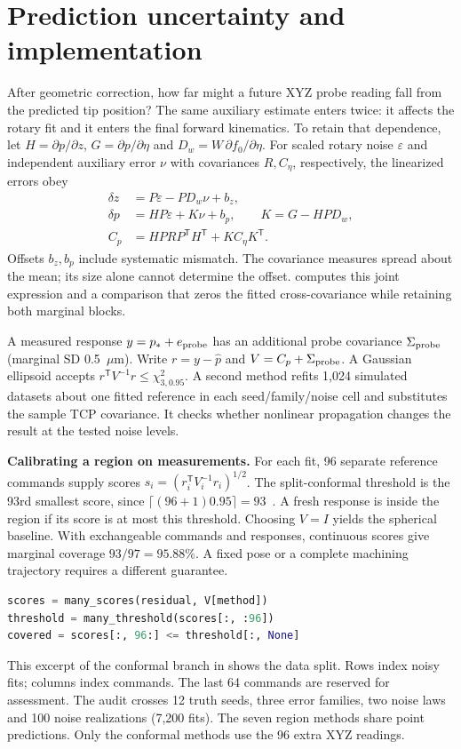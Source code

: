 \documentclass[11pt,a4paper]{article}
\newcommand{\um}{\ensuremath{\mu\mathrm{m}}}
\newcommand{\file}[1]{\texttt{\detokenize{#1}}}
\newcommand{\tr}{^{\mathsf T}}
\begin{document}
\section{Prediction uncertainty and implementation}
After geometric correction, how far might a future XYZ probe reading fall from the predicted tip position? The same auxiliary estimate enters twice: it affects the rotary fit and it enters the final forward kinematics. To retain that dependence, let $H=\partial p/\partial z$, $G=\partial p/\partial\eta$ and $D_w=W\,\partial f_0/\partial\eta$. For scaled rotary noise $\varepsilon$ and independent auxiliary error $\nu$ with covariances $R,C_\eta$, respectively, the linearized errors obey
\begin{align}
 \delta z&=P\varepsilon-PD_w\nu+b_z,\\
 \delta p&=HP\varepsilon+K\nu+b_p,\qquad K=G-HPD_w,\\
 C_p&=HP R P\tr H\tr + K C_\eta K\tr .
\end{align}
Offsets $b_z,b_p$ include systematic mismatch. The covariance measures spread about the mean; its size alone cannot determine the offset. \file{audit_models.covariance_variants} computes this joint expression and a comparison that zeros the fitted cross-covariance while retaining both marginal blocks.
 
A measured response $y=p_*+e_{\rm probe}$ has an additional probe covariance $\Sigma_{\rm probe}$ (marginal SD 0.5~\um). Write $r=y-\hat p$ and $V=C_p+\Sigma_{\rm probe}$. A Gaussian ellipsoid accepts $r\tr V^{-1}r\leq\chi^2_{3,0.95}$. A second method refits 1,024 simulated datasets about one fitted reference in each seed/family/noise cell and substitutes the sample TCP covariance. It checks whether nonlinear propagation changes the result at the tested noise levels.
 
\textbf{Calibrating a region on measurements.} For each fit, 96 separate reference commands supply scores $s_i=(r_i\tr V_i^{-1}r_i)^{1/2}$. The split-conformal threshold is the 93rd smallest score, since $\lceil(96+1)0.95\rceil=93$~\cite{lei}. A fresh response is inside the region if its score is at most this threshold. Choosing $V=I$ yields the spherical baseline. With exchangeable commands and responses, continuous scores give marginal coverage $93/97=95.88\%$. A fixed pose or a complete machining trajectory requires a different guarantee.
 
\begin{lstlisting}[language=Python]
scores = many_scores(residual, V[method])
threshold = many_threshold(scores[:, :96])
covered = scores[:, 96:] <= threshold[:, None]
\end{lstlisting}
This excerpt of the conformal branch in \file{audit_studies.py} shows the data split. Rows index noisy fits; columns index commands. The last 64 commands are reserved for assessment. The audit crosses 12 truth seeds, three error families, two noise laws and 100 noise realizations (7,200 fits). The seven region methods share point predictions. Only the conformal methods use the 96 extra XYZ readings.
\newpage
\enlargethispage{8mm}
\end{document}
